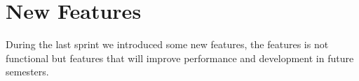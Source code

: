 
\chapter{New Features}
\label{cha:new_features}

During the last sprint we introduced some new features, the features is not functional but features that will improve performance and development in future semesters.





